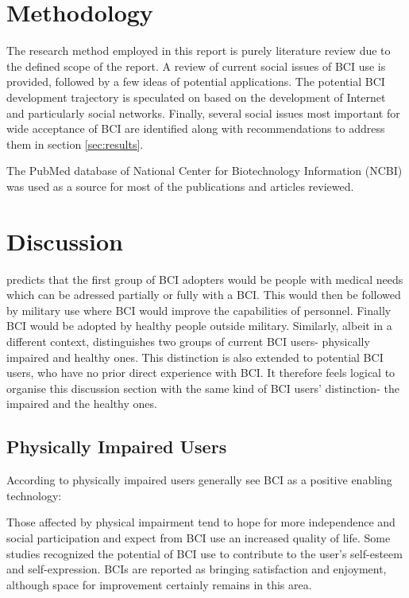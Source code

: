 \documentclass[fleqn,11pt]{olplainarticle}
\begin{document}
\section{Methodology}
The research method employed in this report is purely literature review due to the defined scope of the report. A review of current social issues of BCI use is provided, followed by a few ideas of potential applications. The potential BCI development trajectory is speculated on based on the development of Internet and particularly social networks. Finally, several social issues most important for wide acceptance of BCI are identified along with recommendations to address them in section \ref{sec:results}.

The PubMed database of  National Center for Biotechnology Information (NCBI) was used as a source for most of the publications and articles reviewed.

\section{Discussion}
\cite{schalk2008brain} predicts that the first group of BCI adopters would be people with medical needs which can be adressed partially or fully with a BCI. This would then be followed by military use where BCI would improve the capabilities of personnel. Finally BCI would be adopted by healthy people outside military. Similarly, albeit in a different context, \cite{kogel2019using} distinguishes two groups of current BCI users- physically impaired and healthy ones. This distinction is also extended to potential BCI users, who have no prior direct experience with BCI. It therefore feels logical to organise this discussion section with the same kind of BCI users' distinction- the impaired and the healthy ones.

\subsection{Physically Impaired Users}
According to \cite{kogel2019using} physically impaired users generally see BCI as a positive enabling technology:
\begin{displayquote}
    Those affected by physical impairment tend to hope for more independence and social participation and expect from BCI use an increased quality of life. Some studies recognized the potential of BCI use to contribute to the user’s self-esteem and self-expression. BCIs are reported as bringing satisfaction and enjoyment, although space for improvement certainly remains in this area.
\end{displayquote}
\end{document}
